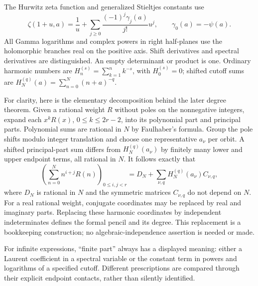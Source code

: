 The Hurwitz zeta function and generalized Stieltjes constants use
\[
 \zeta(1+u,a)=\frac1u+
       \sum_{j\ge0}\frac{(-1)^j\gamma_j(a)}{j!}u^j,
 \qquad \gamma_0(a)=-\psi(a).
\]
All Gamma logarithms and complex powers in right half-planes use the
holomorphic branches real on the positive axis. Shift derivatives and
spectral derivatives are distinguished. An empty determinant or product
is one. Ordinary harmonic numbers are
$H_n^{(s)}=\sum_{k=1}^{n}k^{-s}$, with $H_0^{(s)}=0$; shifted
cutoff sums are $H_N^{(q)}(a)=\sum_{n=0}^{N}(n+a)^{-q}$.

For clarity, here is the elementary decomposition behind the later
degree theorem. Given a rational weight $R$ without poles on the
nonnegative integers, expand each $x^kR(x)$, $0\le k\le2r-2$, into
its polynomial part and principal parts. Polynomial sums are rational
in $N$ by Faulhaber's formula. Group the pole shifts modulo integer
translation and choose one representative $a_\nu$ per orbit. A shifted
principal-part sum differs from $H_N^{(q)}(a_\nu)$ by finitely many
lower and upper endpoint terms, all rational in $N$. It follows exactly
that
\begin{equation}\label{scope:harmonic-decomposition}
 \left(\sum_{n=0}^{N}n^{i+j}R(n)\right)_{0\le i,j<r}
 =D_N+\sum_{\nu,q}H_N^{(q)}(a_\nu)C_{\nu,q},
\end{equation}
where $D_N$ is rational in $N$ and the symmetric matrices
$C_{\nu,q}$ do not depend on $N$. For a real rational weight,
conjugate coordinates may be replaced by real and imaginary parts.
Replacing these harmonic coordinates by independent indeterminates
defines the formal pencil and its degree. This replacement is a
bookkeeping construction; no algebraic-independence assertion is
needed or made.

For infinite expressions, ``finite part'' always has a displayed
meaning: either a Laurent coefficient in a spectral variable or the
constant term in powers and logarithms of a specified cutoff.
Different prescriptions are compared through their explicit endpoint
contacts, rather than silently identified.
